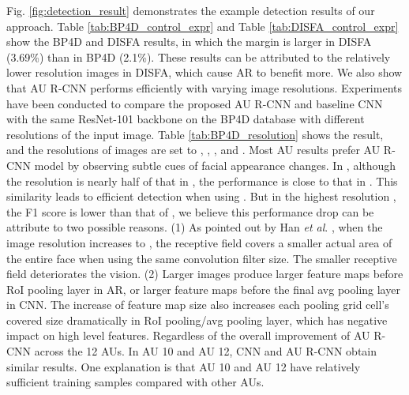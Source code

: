 \documentclass[5p,twocolumn]{elsarticle}
\newcommand{\etal}{\textit{et al}. }
\begin{document}
Fig. \ref{fig:detection_result} demonstrates the example detection results of our approach.
Table \ref{tab:BP4D_control_expr} and Table \ref{tab:DISFA_control_expr} show the BP4D and DISFA results, in which the margin is larger in DISFA (3.69\%) than in BP4D (2.1\%). These results can be attributed to the relatively lower resolution images in DISFA, which cause AR to benefit more.
We also show that AU R-CNN performs efficiently with varying image resolutions. Experiments have been conducted to compare the proposed AU R-CNN and baseline CNN with the same ResNet-101 backbone on the BP4D database with different resolutions of the input image. Table \ref{tab:BP4D_resolution} shows the result, and the resolutions of images are set to , , , and . Most AU results prefer AU R-CNN model by observing subtle cues of facial appearance changes. In , although the resolution is nearly half of that in , the performance is close to that in . This similarity leads to efficient detection when using . But in the highest resolution , the F1 score is lower than that of , we believe this performance drop can be attribute to two possible reasons. (1)
As pointed out by Han \etal \cite{han2017optimizing}, when the image resolution increases to , the receptive field covers a smaller actual area of the entire face when using the same convolution filter size. The smaller receptive field deteriorates the vision. (2) Larger images produce larger feature maps before RoI pooling layer in AR, or larger feature maps before the final avg pooling layer in CNN. The increase of feature map size also increases each pooling grid cell's covered size dramatically in RoI pooling/avg pooling layer, which has negative impact on high level features. Regardless of the overall improvement of AU R-CNN across the 12 AUs. In AU 10 and AU 12, CNN and AU R-CNN obtain similar results. One explanation is that AU 10 and AU 12 have relatively sufficient training samples compared with other AUs.
\end{document}
